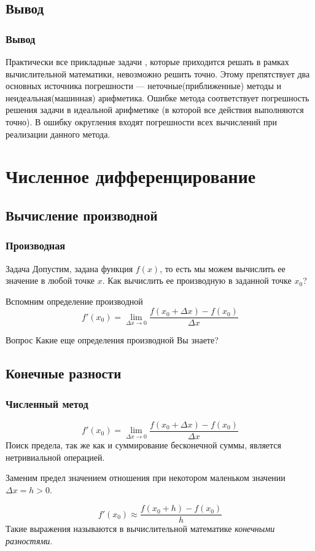\documentclass[aspectratio=169,unicode]{beamer}
\begin{document}
\subsection{Вывод}
\begin{frame}
\frametitle{Вывод}
{
	Практически все прикладные задачи , которые приходится решать в рамках вычислительной математики, невозможно решить точно.
	Этому препятствует два основных источника погрешности --- неточные(приближенные) методы и неидеальная(машинная) арифметика.
	Ошибке метода соответствует погрешность решения задачи в идеальной арифметике (в которой все действия выполняются точно).
	В ошибку округления входят погрешности всех вычислений при реализации данного метода.
}
\end{frame}

\section{Численное дифференцирование}
\subsection{Вычисление производной}
\begin{frame}
\frametitle{Производная}
	\begin{block}{Задача}
	Допустим, задана функция $f(x)$, то есть мы можем вычислить ее значение в любой точке $x$.
	Как вычислить ее производную в заданной точке $x_0$?
	\end{block}
	\pause
	Вспомним определение производной
	\[
	f'(x_0) = \lim_{\Delta x \rightarrow 0} \frac{f(x_0+\Delta x) -
	f(x_0)}{\Delta x}
	\]
	\begin{block}{Вопрос}
	Какие еще определения производной Вы знаете?
	\end{block}
\end{frame}

\subsection{Конечные разности}
\begin{frame}
\frametitle{Численный метод}
	\[
	f'(x_0) = \lim_{\Delta x \rightarrow 0} \frac{f(x_0+\Delta x) - f(x_0)}{\Delta x}
	\]
	Поиск предела, так же как и суммирование бесконечной суммы, является нетривиальной операцией.

	\pause
	Заменим предел значением отношения при некотором маленьком значении $\Delta x = h > 0$.

	\[
	f'(x_0) \approx \frac{f(x_0+h) - f(x_0)}{h}
	\]
	Такие выражения называются в вычислительной математике \emph{конечными
	разностями}.
\end{frame}
\end{document}
